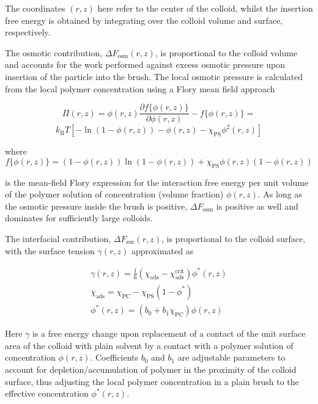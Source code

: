 \documentclass[12pt, a4paper]{article}
\begin{document}
\noindent The coordinates $(r,z)$ here refer to the center of the colloid, whilst the insertion free energy is obtained by integrating over the colloid volume and surface, respectively.

The osmotic contribution, $\Delta F_{\text{osm}}(r,z)$, is proportional to the colloid volume 
and accounts for the work performed against excess osmotic pressure upon insertion of the particle into the brush. 
The local osmotic pressure is calculated from the local polymer concentration using a Flory mean field approach 

$$
\Pi(r,z)=  \phi(r,z)\frac{\partial f\{\phi(r,z)\}}{\partial \phi(r,z)} - f\{\phi(r,z)\}= 
$$
\begin{equation}
	k_{\text{B}}T[-\ln(1-\phi(r,z)) - \phi(r,z) -\chi_{\text{PS}}\phi^2(r,z)]
\end{equation}

\noindent where
$$
f\{\phi(r,z)\}=(1-\phi(r,z))\ln(1-\phi(r,z)) +\chi_{\text{PS}}\phi(r,z)(1-\phi(r,z))
$$

\noindent is the mean-field Flory expression for the interaction free energy per unit volume of the polymer solution of concentration (volume fraction) $\phi(r,z)$.
As long as the osmotic pressure inside the brush is positive, $\Delta F_{\text{osm}}$ is positive as well and dominates for sufficiently large colloids. 

The interfacial contribution, $\Delta F_{\text{sur}}(r,z)$, is proportional to the colloid surface, 
with the surface tension $\gamma (r,z)$ approximated as

\begin{eqnarray}
    \gamma (r,z)= \frac{1}{6}(\chi_{\text{ads}} - \chi_{\text{ads}}^{\text{crit}})\phi^{\ast}(r,z)
    \\
    \label{eq:chi_ads}
    \chi_{\text{ads}} = \chi_{\text{PC}} - \chi_{\text{PS}}(1-\phi^{\ast})
    \\
    \phi^{\ast}(r,z)= (b_{0} + b_{1}\chi_{\text{PC}})\phi(r,z)
\end{eqnarray}

\noindent Here $\gamma$ is a free energy change upon replacement of a contact of the unit surface area of the colloid with plain solvent by a contact with a polymer solution of concentration $\phi(r,z)$.
Coefficients $b_0$ and $b_1$ are adjustable parameters to account for depletion/accumulation of polymer in the proximity of the colloid surface, 
thus adjusting the local polymer concentration in a plain brush to the effective concentration $\phi^{\ast}(r,z)$.
\end{document}
